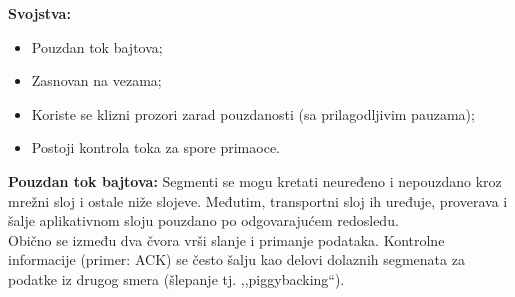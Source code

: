 \documentclass[a4paper]{article}
\begin{document}
    \noindent \textbf{Svojstva:}
    \begin{itemize}
        \item Pouzdan tok bajtova;
        \item Zasnovan na vezama;
        \item Koriste se klizni prozori zarad pouzdanosti (sa prilagodljivim pauzama);
        \item Postoji kontrola toka za spore primaoce.
    \end{itemize}
    \textbf{Pouzdan tok bajtova:} Segmenti se mogu kretati neuređeno i nepouzdano kroz
    mrežni sloj i ostale niže slojeve. Međutim, transportni sloj ih uređuje, proverava i šalje
    aplikativnom sloju pouzdano po odgovarajućem redosledu. \\
    \indent Obično se između dva čvora vrši slanje i primanje podataka. Kontrolne informacije
    (primer: ACK) se često šalju kao delovi dolaznih segmenata za podatke iz drugog smera (šlepanje
    tj. ,,piggybacking``).
\end{document}

